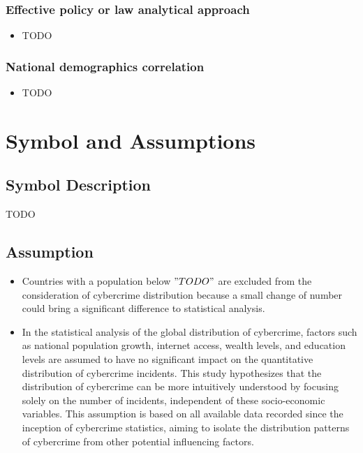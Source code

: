 \documentclass[12pt]{article}
\begin{document}
		\subsubsection[]{Effective policy or law analytical approach} %
			\begin{itemize}
				\item TODO %
			\end{itemize}
		\subsubsection[]{National demographics correlation} %
			\begin{itemize}
				\item TODO %
			\end{itemize}
	
\section{Symbol and Assumptions}\label{sec:symbol-and-assumptions} %
	\subsection{Symbol Description}\label{subsec:symbol-description} %
		TODO %
	\subsection{Assumption}\label{subsec:assumption} %
		\begin{itemize}
			\item Countries with a population below \( "TODO" \) are excluded from the consideration of cybercrime distribution because
				a small change of number could bring a significant difference to statistical analysis.
			\item In the statistical analysis of the global distribution of cybercrime,
				factors such as national population growth, internet access, wealth levels, and education levels
				are assumed to have no significant impact on the quantitative distribution of cybercrime incidents.
				This study hypothesizes that the distribution of cybercrime can be more intuitively understood by focusing solely on the number of incidents,
				independent of these socio-economic variables.
				This assumption is based on all available data recorded since the inception of cybercrime statistics,
				aiming to isolate the distribution patterns of cybercrime from other potential influencing factors.
		\end{itemize}
\end{document}
